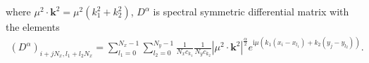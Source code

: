 \documentclass[preprint,compress,3p,10pt,fleqn]{elsarticle}
\numberwithin{equation}{section}
\newtheorem{remark}[theorem]{Remark}
\begin{document}
where $\mu^{2} \cdot \mathbf{k}^{2}=\mu^{2}\left(k_{1}^{2}+k_{2}^{2}\right)$, $D^{\alpha}$ is spectral symmetric differential matrix with the elements
\begin{align}\label{eq_54}
\left(D^{\alpha}\right)_{i+j N_{x}, l_{1}+l_{2} N_{x}}=\sum\limits_{l_{1}=0}^{N_{x}-1} \sum\limits_{l_{2}=0}^{N_{y}-1}\frac{1}{N_{x} c_{k_{1}}} \frac{1}{N_{y} c_{k_{2}}}\left|\mu^{2} \cdot \mathbf{k}^{2}\right|^{\frac{\alpha}{2}} e^{\mathrm{i}\mu\left(k_{1}\left(x_{i}-x_{l_{1}}\right)+k_{2}\left(y_{j}-y_{l_{2}}\right)\right)}.
\end{align}



	
\end{document}
